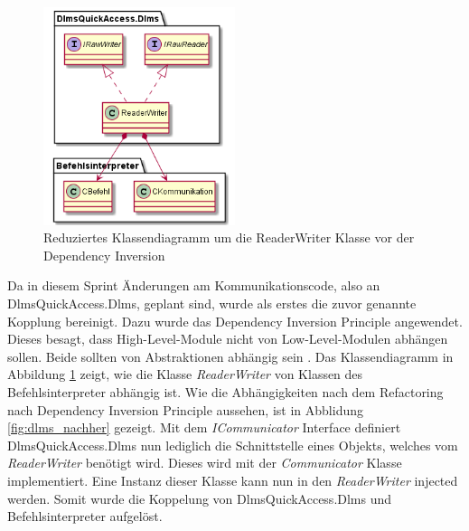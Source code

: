 \begin{figure}[H]
   \centering
   \includegraphics[width=0.5\textwidth]{gfx/dlms_vorher.png}
   \caption{
      Reduziertes Klassendiagramm um die ReaderWriter Klasse vor der Dependency Inversion
   }
   \label{fig:dlms_vorher}
\end{figure}

Da in diesem Sprint Änderungen am Kommunikationscode, also an DlmsQuickAccess.Dlms, geplant sind, wurde als erstes die zuvor genannte Kopplung bereinigt.
Dazu wurde das Dependency Inversion Principle angewendet.
Dieses besagt, dass High-Level-Module nicht von Low-Level-Modulen abhängen sollen.
Beide sollten von Abstraktionen abhängig sein \parencite{madasu35solid}.
Das Klassendiagramm in Abbildung \ref{fig:dlms_vorher} zeigt, wie die Klasse \textit{ReaderWriter} von Klassen des Befehlsinterpreter abhängig ist.
Wie die Abhängigkeiten nach dem Refactoring nach Dependency Inversion Principle aussehen, ist in Abblidung \ref{fig:dlms_nachher} gezeigt.
Mit dem \textit{ICommunicator} Interface definiert DlmsQuickAccess.Dlms nun lediglich die Schnittstelle eines Objekts, welches vom \textit{ReaderWriter} benötigt wird.
Dieses wird mit der \textit{Communicator} Klasse implementiert. Eine Instanz dieser Klasse kann nun in den \textit{ReaderWriter} injected werden.
Somit wurde die Koppelung von DlmsQuickAccess.Dlms und Befehlsinterpreter aufgelöst.


